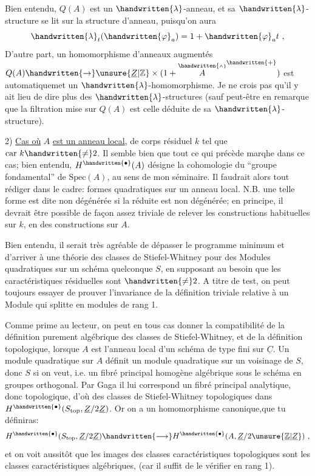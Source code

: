 Bien entendu, $Q(A)$ est un $\handwritten{\lambda}$-anneau, et sa $\handwritten{\lambda}$-structure se lit sur la structure d'anneau, puisqu'on aura
\[
\handwritten{\lambda}_t(\handwritten{\varphi}_a)=1+\handwritten{\varphi}_a t\ ,
\]
D'autre part, un homomorphisme d'anneaux augmentés $Q(A)\handwritten{\to}\unsure{\underline{Z}|\mathbb{Z}}\times(1+\overset{\handwritten{\scriptscriptstyle\wedge}}{A}^{\handwritten{+}})$ est automatiquemet un $\handwritten{\lambda}$-homomorphisme. Je ne crois pas qu'il y ait lieu de dire plus des $\handwritten{\lambda}$-structures (sauf peut-être en remarque que la filtration mise sur $Q(A)$ est celle déduite de sa $\handwritten{\lambda}$-structure).

2) \uline{Cas où} $A$ \uline{est un anneau local}, de corps résiduel $k$ tel que $\mathrm{car}\ k\handwritten{\ne}2$. Il semble bien que tout ce qui précède marqhe dans ce cas; bien entendu, $H^{\handwritten{\bullet}}(A)$ désigne la cohomologie du ``groupe fondamental'' de $\mathrm{Spec}(A)$, au sens de mon séminaire. Il faudrait alors tout rédiger dans le cadre: formes quadratiques sur un anneau local. N.B. une telle forme est dite non dégénérée si la réduite est non dégénérée; en principe, il  devrait être possible de façon assez triviale de relever les constructions habituelles sur $k$, en des constructions sur $A$.

Bien entendu, il serait très agréable de dépasser le programme minimum et d'arriver à une théorie des classes de Stiefel-Whitney pour des Modules quadratiques sur un schéma quelconque $S$,  en supposant au besoin que les caractéristiques résiduelles sont $\handwritten{\ne}2$.  A titre de test, on peut toujours essayer de prouver l'invariance de la définition triviale relative à un Module qui splitte en modules de rang 1.

Comme prime au lecteur, on peut en tous cas donner la compatibilité de la définition purement algébrique des classes de Stiefel-Whitney, et de la définition topologique, lorsque $A$ est l'anneau local d'un schéma de type fini sur $\underline{C}$. Un module quadratique sur $A$ définit un module quadratique sur un voisinage de $S$, donc $S$ si on veut, i.e. un fibré principal homogène algébrique sous le schéma en groupes orthogonal. Par Gaga il lui correspond un fibré principal analytique, donc topologique, d'où des classes de Stiefel-Whitney topologiques dans $H^{\handwritten{\bullet}}(S_{\mathrm{top}},\underline{Z}/2\underline{Z})$. Or on a un homomorphisme canonique,que tu définiras:
\[
H^{\handwritten{\bullet}}(S_{\mathrm{top}},\underline{Z}/2\underline{Z})\handwritten{\longrightarrow}H^{\handwritten{\bullet}}(A,\underline{Z}/2\unsure{\underline{\mathbb{Z}}|\underline{Z}})\ ,
\]
et on voit aussitôt que les images des classes caractéristiques topologiques sont les classes caractéristiques algébriques, (car il suffit de le vérifier en rang 1).

